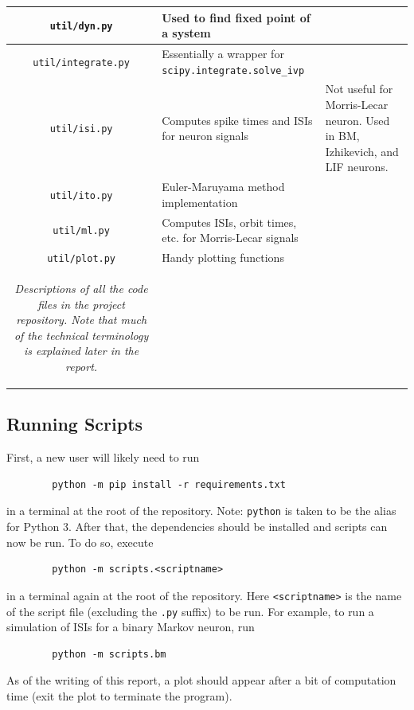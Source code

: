 \documentclass[letterpaper,12pt]{article}
\numberwithin{table}{section}
\numberwithin{figure}{section}
\numberwithin{equation}{section}
\newcommand{\ccaption}[1]{\caption{\textit{#1}}}
\begin{document}
\begin{flushleft}
\begin{center}
\begin{tabularx}{\linewidth}{ | c | Y | X | }
            \texttt{util/dyn.py} & Used to find fixed point of a system & \\
            \hline
            \texttt{util/integrate.py} & Essentially a wrapper for \texttt{scipy.integrate.solve\_ivp
            } & \\
            \hline
            \texttt{util/isi.py} & Computes spike times and ISIs for neuron signals & Not useful for Morris-Lecar neuron. Used in BM, Izhikevich, and LIF neurons. \\
            \hline
            \texttt{util/ito.py} & Euler-Maruyama method implementation & \\
            \hline
            \texttt{util/ml.py} & Computes ISIs, orbit times, etc. for Morris-Lecar signals & \\
            \hline
            \texttt{util/plot.py} & Handy plotting functions & \\
            \hline

            \captionsetup{width=\linewidth}
            \ccaption{Descriptions of all the code files in the project repository. Note that much of the technical terminology is explained later in the report.}
            \label{tab:code-files}

        \end{tabularx}
    
    \end{center}

    \subsection{Running Scripts}
    First, a new user will likely need to run
    \begin{lstlisting}
        python -m pip install -r requirements.txt
    \end{lstlisting}
    in a terminal at the root of the repository. Note: \texttt{python} is taken to be the alias for Python 3. After that, the dependencies should be installed and scripts can now be run. To do so, execute
    \begin{lstlisting}
        python -m scripts.<scriptname>
    \end{lstlisting}
    in a terminal again at the root of the repository. Here \texttt{<scriptname>} is the name of the script file (excluding the \texttt{.py} suffix) to be run. For example, to run a simulation of ISIs for a binary Markov neuron, run
    \begin{lstlisting}
        python -m scripts.bm
    \end{lstlisting}
    As of the writing of this report, a plot should appear after a bit of computation time (exit the plot to terminate the program).


\end{flushleft}
\end{document}
